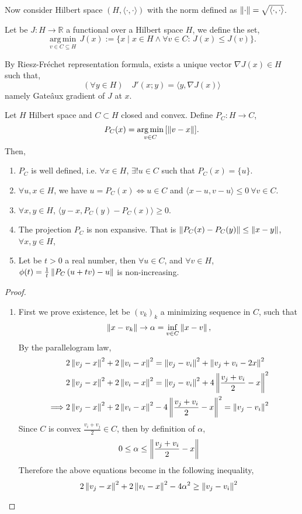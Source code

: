 Now consider Hilbert space $(H, \langle \cdot,\cdot \rangle)$ with the norm defined as $\left\lVert\cdot\right\rVert=\sqrt{\langle\cdot,\cdot\rangle}$.

Let be $J: H\rightarrow \mathbb{R}$ a functional over a Hilbert space $H$, we define the set,
\[
{\displaystyle {\underset {v\in C\subseteq H}{\operatorname {arg\,min} }}\,J(x):=\{x\mid x\in H \wedge \forall v\in C:\,J(x)\leq J(v)\}.}\]


By Riesz-Fr\'echet representation formula, exists a unique vector $\nabla J(x) \in H$ such that, 
\[
(\forall y \in H) \quad J'(x; y)=\langle y, \nabla J(x)\rangle
\]
namely Gate\^aux gradient of $J$ at $x$. 

\begin{lemma}
\label{lemma3. Projection}
Let $H$ Hilbert space and $C\subset H$ closed and convex. Define $P_C: H\rightarrow C$, \[P_C(x)={\displaystyle {\underset {v\in C}{\operatorname {arg\,min} }}\left[\left\lVert v-x\right\rVert\right]}.\]
Then,
\begin{enumerate}
	\item $P_C$ is well defined, i.e.  $\forall x \in H $, $\exists !u \in C$ such that $P_C(x)=\{u\}$.
	\item $\forall u,x\in H$, we have $u=P_C(x) \iff u\in C$  and  $\langle x-u, v-u\rangle\leq 0\ \forall v \in C$.
	\item $\forall x,y \in H$, $\langle y-x, P_C(y)-P_C(x)\rangle \geq 0$.
	\item The projection $P_C$ is non expansive. That is $\left\lVert P_C(x)-P_C(y)\right\rVert\leq \left\lVert x-y\right\rVert$, $\forall x,y\in H$, 
	\item Let be $t>0$ a real number, then $\forall u \in C$, and $\forall v\in H$, $\phi(t)=\frac{1}{t}\left\lVert P_C\left(u+tv\right)-u\right\rVert$ is non-increasing.
\end{enumerate}
\begin{proof}\
	\begin{enumerate}
		\item First we prove existence, let be $(v_k)_k$ a minimizing sequence in $C$, such that
		\[
			\left\lVert x-v_k\right\rVert\rightarrow \alpha=\inf_{v \in C}\left\lVert x-v\right\rVert,
		\]
		By the parallelogram law,
		\begin{align*}
			&2\left\lVert v_j-x\right\rVert^2+2\left\lVert v_i-x\right\rVert^2= \left\lVert v_j-v_i\right\rVert^2+\left\lVert v_j+v_i-2x\right\rVert^2 \\
			&2\left\lVert v_j-x\right\rVert^2+2\left\lVert v_i-x\right\rVert^2= \left\lVert v_j-v_i\right\rVert^2+4\left\lVert\frac{v_j+v_i}{2}-x\right\rVert^2\\
	\implies&2\left\lVert v_j-x\right\rVert^2+2\left\lVert v_i-x\right\rVert^2-4\left\lVert\frac{v_j+v_i}{2}-x\right\rVert^2=\left\lVert v_j-v_i\right\rVert^2
		\end{align*}
		Since $C$ is convex $\frac{v_i+v_j}{2} \in C$, then by definition of $\alpha$,
		\[
		0\leq \alpha \leq \left\lVert\frac{v_j+v_i}{2}-x\right\rVert
		\]  
		Therefore the above equations become in the following inequality,
		\[
		2\left\lVert v_j-x\right\rVert^2+2\left\lVert v_i-x\right\rVert^2-4\alpha^2\geq \left\lVert v_j-v_i\right\rVert^2
		\]
		

\end{enumerate}
\end{proof}
\end{lemma}
